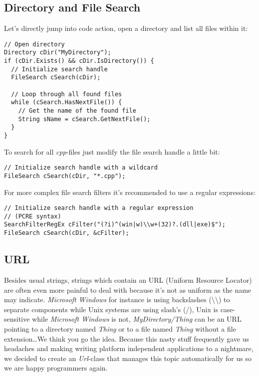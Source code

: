 \subsection{Directory and File Search}
Let's directly jump into code action, open a directory and list all files within it:

\begin{lstlisting}[caption=Directory and file search usage example]
// Open directory
Directory cDir("MyDirectory");
if (cDir.Exists() && cDir.IsDirectory()) {
  // Initialize search handle
  FileSearch cSearch(cDir);

  // Loop through all found files
  while (cSearch.HasNextFile()) {
    // Get the name of the found file
    String sName = cSearch.GetNextFile();
  }
}
\end{lstlisting}

To search for all \emph{cpp}-files just modify the file search handle a little bit:

\begin{lstlisting}[caption=Wildcard search handle]
// Initialize search handle with a wildcard
FileSearch cSearch(cDir, "*.cpp");
\end{lstlisting}

For more complex file search filters it's recommended to use a regular expressions:

\begin{lstlisting}[caption=Regular expression search handle]
// Initialize search handle with a regular expression
// (PCRE syntax)
SearchFilterRegEx cFilter("(?i)^(win|w)\\w+(32)?.(dll|exe)$");
FileSearch cSearch(cDir, &cFilter);
\end{lstlisting}




\subsection{URL}
Besides usual strings, strings which contain an URL (Uniform Resource Locator) are often even more painful to deal with because it's not as uniform as the name may indicate. \emph{Microsoft Windows} for instance is using backslashes (\textbackslash\textbackslash) to separate components while Unix systems are using slash's (/), Unix is case-sensitive while \emph{Microsoft Windows} is not, \emph{MyDirectory/Thing} can be an URL pointing to a directory named \emph{Thing} or to a file named \emph{Thing} without a file extension\ldots We think you go the idea. Because this nasty stuff frequently gave us headaches and making writing platform independent applications to a nightmare, we decided to create an \emph{Url}-class that manages this topic automatically for us so we are happy programmers again.

